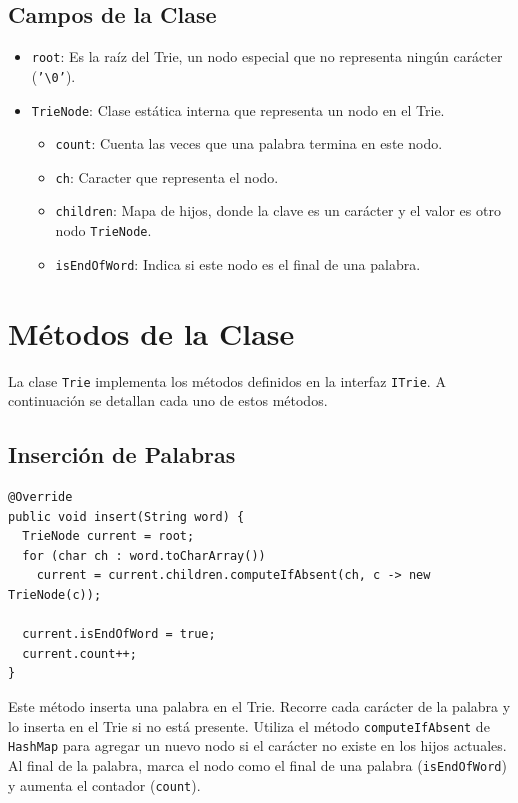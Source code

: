\documentclass[11pt, a4paper]{article}
\begin{document}
\subsection{Campos de la Clase}
\begin{itemize}
  \item \texttt{root}: Es la raíz del Trie, un nodo especial que no representa ningún carácter (\texttt{'\textbackslash0'}).
  \item \texttt{TrieNode}: Clase estática interna que representa un nodo en el Trie.
  \begin{itemize}
    \item \texttt{count}: Cuenta las veces que una palabra termina en este nodo.
    \item \texttt{ch}: Caracter que representa el nodo.
    \item \texttt{children}: Mapa de hijos, donde la clave es un carácter y el valor es otro nodo \texttt{TrieNode}.
    \item \texttt{isEndOfWord}: Indica si este nodo es el final de una palabra.
  \end{itemize}
\end{itemize}

\section{Métodos de la Clase}
La clase \texttt{Trie} implementa los métodos definidos en la interfaz \texttt{ITrie}. A continuación se detallan cada uno de estos métodos.

\subsection{Inserción de Palabras}
\begin{verbatim}
@Override
public void insert(String word) {
  TrieNode current = root;
  for (char ch : word.toCharArray())
    current = current.children.computeIfAbsent(ch, c -> new TrieNode(c));

  current.isEndOfWord = true;
  current.count++;
}
\end{verbatim}

Este método inserta una palabra en el Trie. Recorre cada carácter de la palabra y lo inserta en el Trie si no está presente. Utiliza el método \texttt{computeIfAbsent} de \texttt{HashMap} para agregar un nuevo nodo si el carácter no existe en los hijos actuales. Al final de la palabra, marca el nodo como el final de una palabra (\texttt{isEndOfWord}) y aumenta el contador (\texttt{count}).
\end{document}
